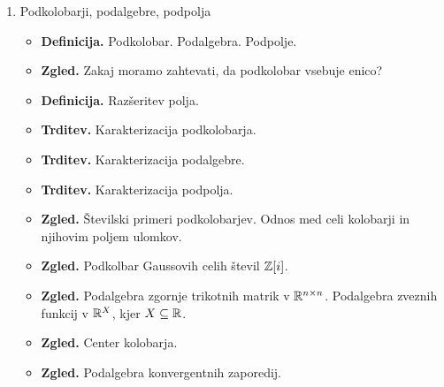 \begin{enumerate}
    \item Podkolobarji, podalgebre, podpolja
    \begin{itemize}
        \item \textbf{Definicija.} Podkolobar. Podalgebra. Podpolje.
        \item \textbf{Zgled.} Zakaj moramo zahtevati, da podkolobar vsebuje enico?
        \item \textbf{Definicija.} Razšeritev polja.
        \item \textbf{Trditev.} Karakterizacija podkolobarja.
        \item \textbf{Trditev.} Karakterizacija podalgebre.
        \item \textbf{Trditev.} Karakterizacija podpolja.
        \item \textbf{Zgled.} Številski primeri podkolobarjev. Odnos med celi kolobarji in njihovim poljem ulomkov.
        \item \textbf{Zgled.} Podkolbar Gaussovih celih števil \(\mathbb{Z}[i]\).
        \item \textbf{Zgled.} Podalgebra zgornje trikotnih matrik v \(\mathbb{R}^{n \times n}\). Podalgebra zveznih funkcij v \(\mathbb{R}^X\), kjer \(X \subseteq \mathbb{R}\).
        \item \textbf{Zgled.} Center kolobarja.
        \item \textbf{Zgled.} Podalgebra konvergentnih zaporedij.
    \end{itemize}


\end{enumerate}
